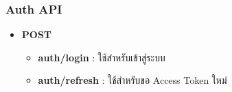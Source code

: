 \subsubsection{Auth API}

\ifenglish
\else
\begin{itemize}
    \item \textbf{POST}
    \begin{itemize}
        \item \textbf{auth/login} : ใช้สำหรับเข้าสู่ระบบ
        \item \textbf{auth/refresh} : ใช้สำหรับขอ Access Token ใหม่
    \end{itemize}
\end{itemize}
\fi